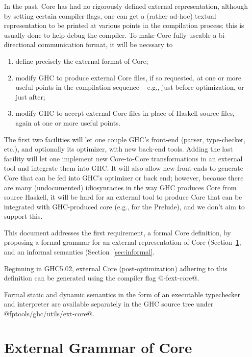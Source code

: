 \documentclass[10pt]{article}
\begin{document}
In the past, Core has had no rigorously defined external representation, although 
by setting certain compiler flags, one can get a (rather ad-hoc) textual
representation to be printed at various points in the compilation process;
this is usually done to help debug the compiler.  To make Core fully useable
a bi-directional communication format, it will be necssary to

\begin{enumerate}
\item define precisely the external format of Core;

\item modify GHC to produce external Core files, if so requested, at one or more
useful points in the compilation sequence -- e.g., just before optimization,
or just after;

\item modify GHC to accept external Core files in place of Haskell 
source files, again at one or more useful points.

\end{enumerate}

The first two facilities will let one couple GHC's front-end (parser,
type-checker, etc.), and optionally its optimizer, with new back-end tools.
Adding the last facility will let one implement new Core-to-Core 
transformations in an external tool and integrate them into GHC. It will also
allow new front-ends to generate Core that can be fed into GHC's optimizer or 
back end; however, because there are many (undocumented)
idiosynracies in the way GHC produces Core from source Haskell, it will be hard
for an external tool to produce Core that can be integrated with GHC-produced core 
(e.g., for the Prelude), and we don't aim to support this.

This document addresses the first requirement, a formal Core definition,
by proposing  a formal grammar for an external representation of Core
(Section~\ref{sec:external}, and 
an informal semantics (Section~\ref{sec:informal}.

Beginning in GHC5.02, external Core (post-optimization) adhering to this definition
can be generated using the compiler flag @-fext-core@.

Formal static and dynamic semantics in the form of an executable typechecker and interpreter
are available separately in the GHC source tree under @fptools/ghc/utils/ext-core@.

\section{External Grammar of Core}
\label{sec:external}
\end{document}

